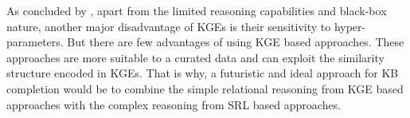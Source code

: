 \documentclass[akbc,twoside,11pt]{article}
\newcommand{\arcchit}[1]{\textcolor{red}{A: {#1}}}
\begin{document}
As concluded by \citet{DBLP:journals/corr/abs-1806-11391}, apart from the limited reasoning capabilities and black-box nature, another major disadvantage of KGEs is their sensitivity to hyper-parameters. But there are few advantages of using KGE based approaches. These approaches are more suitable to a curated data and can exploit the similarity structure encoded in KGEs. That is why, a futuristic and ideal approach for KB completion would be to combine the simple relational reasoning from KGE based approaches with the complex reasoning from SRL based approaches.

\end{document}
